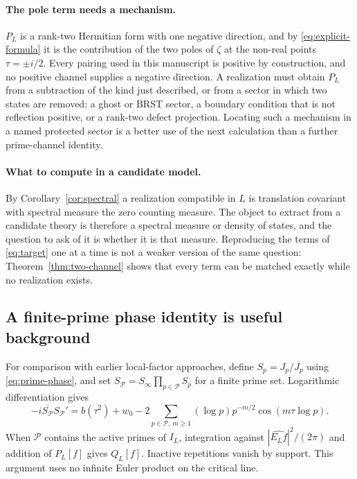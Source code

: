 \paragraph{The pole term needs a mechanism.}
$P_L$ is a rank-two Hermitian form with one negative direction, and by
\eqref{eq:explicit-formula} it is the contribution of the two poles of
$\zeta$ at the non-real points $\tau=\pm i/2$. Every pairing used in this
manuscript is positive by construction, and no positive channel supplies a
negative direction. A realization must obtain $P_L$ from a subtraction of
the kind just described, or from a sector in which two states are removed:
a ghost or BRST sector, a boundary condition that is not reflection
positive, or a rank-two defect projection. Locating such a mechanism in a
named protected sector is a better use of the next calculation than a
further prime-channel identity.

\paragraph{What to compute in a candidate model.}
By Corollary~\ref{cor:spectral} a realization compatible in $L$ is
translation covariant with spectral measure the zero counting measure. The
object to extract from a candidate theory is therefore a spectral measure or
density of states, and the question to ask of it is whether it is that
measure. Reproducing the terms of \eqref{eq:target} one at a time is not a
weaker version of the same question: Theorem~\ref{thm:two-channel} shows that
every term can be matched exactly while no realization exists.

\subsection{A finite-prime phase identity is useful background}
For comparison with earlier local-factor approaches, define
$S_p=J_p/\overline{J_p}$ using \eqref{eq:prime-phase}, and set
$S_{\mathcal P}=S_\infty\prod_{p\in\mathcal P}S_p$ for a finite prime
set. Logarithmic differentiation gives
\begin{equation}\label{eq:finite-phase}
 -i\overline{S_{\mathcal P}}S_{\mathcal P}'
 =b(\tau^2)+w_0
 -2\sum_{p\in\mathcal P,\,m\geq1}(\log p)p^{-m/2}
                         \cos(m\tau\log p).
\end{equation}
When $\mathcal P$ contains the active primes of $I_L$, integration
against $|\widehat{E_Lf}|^2/(2\pi)$ and addition of $P_L[f]$ gives
$Q_L[f]$. Inactive repetitions vanish by support. This argument uses
no infinite Euler product on the critical line.


